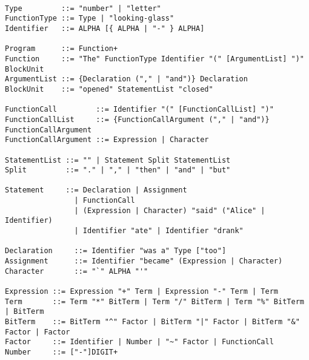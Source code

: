 \documentclass[a4wide, 11pt]{article}
\begin{document}
\begin{verbatim}

Type         ::= "number" | "letter"
FunctionType ::= Type | "looking-glass"
Identifier   ::= ALPHA [{ ALPHA | "-" } ALPHA]

Program      ::= Function+
Function     ::= "The" FunctionType Identifier "(" [ArgumentList] ")" BlockUnit
ArgumentList ::= {Declaration ("," | "and")} Declaration
BlockUnit    ::= "opened" StatementList "closed"

FunctionCall         ::= Identifier "(" [FunctionCallList] ")"
FunctionCallList     ::= {FunctionCallArgument ("," | "and")} FunctionCallArgument
FunctionCallArgument ::= Expression | Character

StatementList ::= "" | Statement Split StatementList
Split         ::= "." | "," | "then" | "and" | "but"

Statement     ::= Declaration | Assignment
                | FunctionCall
                | (Expression | Character) "said" ("Alice" | Identifier)
                | Identifier "ate" | Identifier "drank"
               
Declaration     ::= Identifier "was a" Type ["too"]
Assignment      ::= Identifier "became" (Expression | Character)
Character       ::= "`" ALPHA "'"

Expression ::= Expression "+" Term | Expression "-" Term | Term
Term       ::= Term "*" BitTerm | Term "/" BitTerm | Term "%" BitTerm | BitTerm
BitTerm    ::= BitTerm "^" Factor | BitTerm "|" Factor | BitTerm "&" Factor | Factor
Factor     ::= Identifier | Number | "~" Factor | FunctionCall
Number     ::= ["-"]DIGIT+ 

\end{verbatim}
\end{document}
